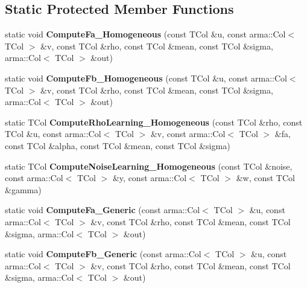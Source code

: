 \subsection*{Static Protected Member Functions}
\begin{DoxyCompactItemize}
\item 
static void {\bfseries Compute\+Fa\+\_\+\+Homogeneous} (const T\+Col \&u, const arma\+::\+Col$<$ T\+Col $>$ \&v, const T\+Col \&rho, const T\+Col \&mean, const T\+Col \&sigma, arma\+::\+Col$<$ T\+Col $>$ \&out)\hypertarget{classkl1p_1_1TEMBPSolver_a24d9c943b040924be1414fb50d364595}{}\label{classkl1p_1_1TEMBPSolver_a24d9c943b040924be1414fb50d364595}

\item 
static void {\bfseries Compute\+Fb\+\_\+\+Homogeneous} (const T\+Col \&u, const arma\+::\+Col$<$ T\+Col $>$ \&v, const T\+Col \&rho, const T\+Col \&mean, const T\+Col \&sigma, arma\+::\+Col$<$ T\+Col $>$ \&out)\hypertarget{classkl1p_1_1TEMBPSolver_aeead007c79872bfd7cd4d0455cf84692}{}\label{classkl1p_1_1TEMBPSolver_aeead007c79872bfd7cd4d0455cf84692}

\item 
static T\+Col {\bfseries Compute\+Rho\+Learning\+\_\+\+Homogeneous} (const T\+Col \&rho, const T\+Col \&u, const arma\+::\+Col$<$ T\+Col $>$ \&v, const arma\+::\+Col$<$ T\+Col $>$ \&fa, const T\+Col \&alpha, const T\+Col \&mean, const T\+Col \&sigma)\hypertarget{classkl1p_1_1TEMBPSolver_a12bc80a9268a440edc0d4603734bb898}{}\label{classkl1p_1_1TEMBPSolver_a12bc80a9268a440edc0d4603734bb898}

\item 
static T\+Col {\bfseries Compute\+Noise\+Learning\+\_\+\+Homogeneous} (const T\+Col \&noise, const arma\+::\+Col$<$ T\+Col $>$ \&y, const arma\+::\+Col$<$ T\+Col $>$ \&w, const T\+Col \&gamma)\hypertarget{classkl1p_1_1TEMBPSolver_a97e92cc9ca1d75cdf74b6c068214eaf8}{}\label{classkl1p_1_1TEMBPSolver_a97e92cc9ca1d75cdf74b6c068214eaf8}

\item 
static void {\bfseries Compute\+Fa\+\_\+\+Generic} (const arma\+::\+Col$<$ T\+Col $>$ \&u, const arma\+::\+Col$<$ T\+Col $>$ \&v, const T\+Col \&rho, const T\+Col \&mean, const T\+Col \&sigma, arma\+::\+Col$<$ T\+Col $>$ \&out)\hypertarget{classkl1p_1_1TEMBPSolver_a7813216d7a86086ba2b72e65ea30a76b}{}\label{classkl1p_1_1TEMBPSolver_a7813216d7a86086ba2b72e65ea30a76b}

\item 
static void {\bfseries Compute\+Fb\+\_\+\+Generic} (const arma\+::\+Col$<$ T\+Col $>$ \&u, const arma\+::\+Col$<$ T\+Col $>$ \&v, const T\+Col \&rho, const T\+Col \&mean, const T\+Col \&sigma, arma\+::\+Col$<$ T\+Col $>$ \&out)\hypertarget{classkl1p_1_1TEMBPSolver_a9e73a54e8d8e23585b97360469e6d425}{}\label{classkl1p_1_1TEMBPSolver_a9e73a54e8d8e23585b97360469e6d425}


\end{DoxyCompactItemize}

